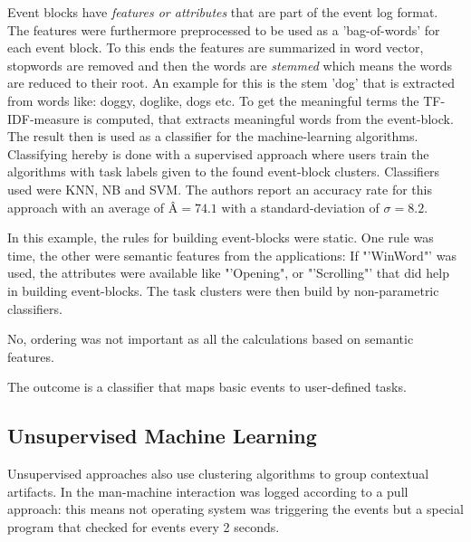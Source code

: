 Event blocks have \textit{features or attributes} that are part of the event log format. The features were furthermore preprocessed to be used as a 'bag-of-words' for each event block. To this ends the features are summarized in word vector, stopwords are removed and then the words are \textit{stemmed} which means the words are reduced to their root. An example for this is the stem 'dog' that is extracted from words like: doggy, doglike, dogs etc. To get the meaningful terms the \acs{TF-IDF}-measure is computed, that extracts meaningful words from the event-block. The result then is used as a classifier for the machine-learning algorithms.  Classifying hereby is done with a supervised approach where users train the algorithms with task labels given to the found event-block clusters. Classifiers used were \ac{KNN}, \ac{NB} and \ac{SVM}. The authors report an accuracy rate for this approach with an average of $Â = 74.1$ with a standard-deviation of $\sigma = 8.2$.


In this example, the rules for building event-blocks were static. One rule was time, the other were semantic features from the applications: If "'WinWord"' was used, the attributes were available like "'Opening", or "'Scrolling"' that did  help in building event-blocks. The task clusters were then build by non-parametric classifiers.


No, ordering was not important as all the calculations based on semantic features.


The outcome is a classifier that maps basic events to user-defined tasks.

\subsection{Unsupervised Machine Learning}
Unsupervised approaches also use clustering algorithms to group contextual artifacts. In \cite{rattenbury2007caad} the man-machine interaction was logged according to a pull approach: this means not operating system was triggering the events but a special program that checked for events every 2 seconds. 

